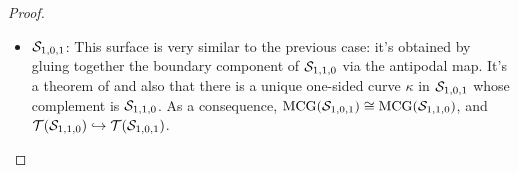 \begin{proof}
\begin{itemize}
  \item $\mathcal{S}_{1,0,1}$: This surface is very similar to the previous case: it's obtained by gluing together the boundary component of $\mathcal{S}_{1,1,0}$ via the antipodal map.
    It's a theorem of \textcite{scharlemann1982complex} and also \textcite{gendulphe2017whats} that there is a unique one-sided curve $\kappa$ in $\mathcal{S}_{1,0,1}$ whose complement is $\mathcal{S}_{1,1,0}$.
    As a consequence, $\mathrm{MCG}(\mathcal{S}_{1,0,1}) \cong \mathrm{MCG}(\mathcal{S}_{1,1,0})$, and $\mathcal{T}(\mathcal{S}_{1,1,0}) \hookrightarrow \mathcal{T}(\mathcal{S}_{1,0,1})$.


\end{itemize}
\end{proof}
